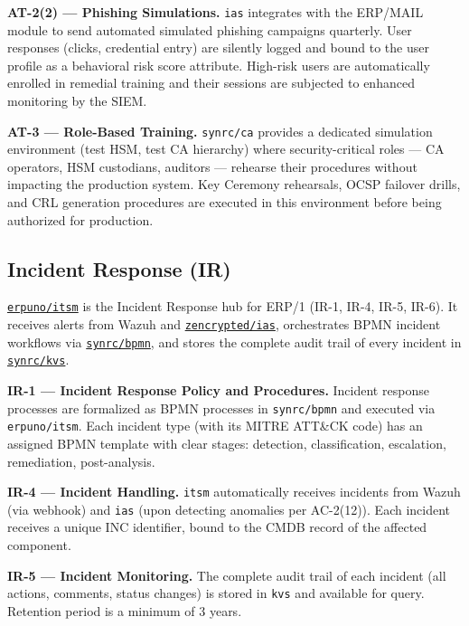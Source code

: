 \documentclass{article}
\begin{document}
\textbf{AT-2(2) --- Phishing Simulations.}
\texttt{ias} integrates with the ERP/MAIL module to send automated simulated phishing campaigns quarterly. User responses (clicks, credential entry) are silently logged and bound to the user profile as a behavioral risk score attribute. High-risk users are automatically enrolled in remedial training and their sessions are subjected to enhanced monitoring by the SIEM.

\textbf{AT-3 --- Role-Based Training.}
\texttt{synrc/ca} provides a dedicated simulation environment (test HSM, test CA hierarchy) where security-critical roles --- CA operators, HSM custodians, auditors --- rehearse their procedures without impacting the production system. Key Ceremony rehearsals, OCSP failover drills, and CRL generation procedures are executed in this environment before being authorized for production.

\subsection{Incident Response (IR)}

\href{https://github.com/erpuno/itsm}{\texttt{erpuno/itsm}} is the Incident Response hub for ERP/1 (IR-1, IR-4, IR-5, IR-6). It receives alerts from Wazuh and \href{https://github.com/zencrypted/ias}{\texttt{zencrypted/ias}}, orchestrates BPMN incident workflows via \href{https://github.com/synrc/bpmn}{\texttt{synrc/bpmn}}, and stores the complete audit trail of every incident in \href{https://github.com/synrc/kvs}{\texttt{synrc/kvs}}.

\textbf{IR-1 --- Incident Response Policy and Procedures.}
Incident response processes are formalized as BPMN processes in \texttt{synrc/bpmn} and executed via \texttt{erpuno/itsm}. Each incident type (with its MITRE ATT\&CK code) has an assigned BPMN template with clear stages: detection, classification, escalation, remediation, post-analysis.

\textbf{IR-4 --- Incident Handling.}
\texttt{itsm} automatically receives incidents from Wazuh (via webhook) and \texttt{ias} (upon detecting anomalies per AC-2(12)). Each incident receives a unique INC identifier, bound to the CMDB record of the affected component.

\textbf{IR-5 --- Incident Monitoring.}
The complete audit trail of each incident (all actions, comments, status changes) is stored in \texttt{kvs} and available for query. Retention period is a minimum of 3 years.
\end{document}
